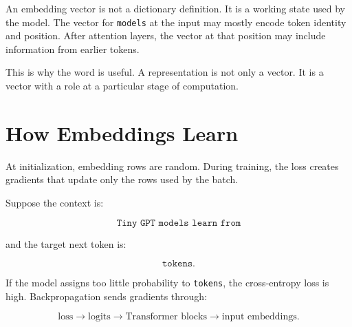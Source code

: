An embedding vector is not a dictionary definition. It is a working state used by the model. The vector for \texttt{models} at the input may mostly encode token identity and position. After attention layers, the vector at that position may include information from earlier tokens.

\begin{center}
\end{center}

This is why the word  is useful. A representation is not only a vector. It is a vector with a role at a particular stage of computation.

\section{How Embeddings Learn}

At initialization, embedding rows are random. During training, the loss creates gradients that update only the rows used by the batch.

Suppose the context is:

\[
\texttt{Tiny GPT models learn from}
\]

and the target next token is:

\[
\texttt{tokens}.
\]

If the model assigns too little probability to \texttt{tokens}, the cross-entropy loss is high. Backpropagation sends gradients through:

\[
\text{loss}\rightarrow \text{logits}\rightarrow \text{Transformer blocks}\rightarrow \text{input embeddings}.
\]

